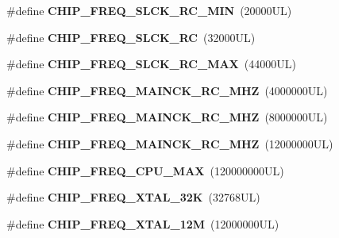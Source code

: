 \begin{DoxyCompactItemize}
\#define {\bfseries C\+H\+I\+P\+\_\+\+F\+R\+E\+Q\+\_\+\+S\+L\+C\+K\+\_\+\+R\+C\+\_\+\+M\+IN}~(20000\+U\+L)
\item 
\mbox{\label{group__SAMV71Q21__definitions_ga3de2f058a0254e9b117154f849ada7cc}} 
\#define {\bfseries C\+H\+I\+P\+\_\+\+F\+R\+E\+Q\+\_\+\+S\+L\+C\+K\+\_\+\+RC}~(32000\+U\+L)
\item 
\mbox{\label{group__SAMV71Q21__definitions_gaecd36c2831859a2de64e3dfcb753e8b2}} 
\#define {\bfseries C\+H\+I\+P\+\_\+\+F\+R\+E\+Q\+\_\+\+S\+L\+C\+K\+\_\+\+R\+C\+\_\+\+M\+AX}~(44000\+U\+L)
\item 
\mbox{\label{group__SAMV71Q21__definitions_gaa86cfccba0dc1e84357cc7613e25886f}} 
\#define {\bfseries C\+H\+I\+P\+\_\+\+F\+R\+E\+Q\+\_\+\+M\+A\+I\+N\+C\+K\+\_\+\+R\+C\+\_\+M\+HZ}~(4000000\+U\+L)
\item 
\mbox{\label{group__SAMV71Q21__definitions_gaa47e66cb0661306ff744015ae138967f}} 
\#define {\bfseries C\+H\+I\+P\+\_\+\+F\+R\+E\+Q\+\_\+\+M\+A\+I\+N\+C\+K\+\_\+\+R\+C\+\_\+M\+HZ}~(8000000\+U\+L)
\item 
\mbox{\label{group__SAMV71Q21__definitions_ga2395f8d0e2096afe77da9a88a86bba81}} 
\#define {\bfseries C\+H\+I\+P\+\_\+\+F\+R\+E\+Q\+\_\+\+M\+A\+I\+N\+C\+K\+\_\+\+R\+C\+\_\+M\+HZ}~(12000000\+U\+L)
\item 
\mbox{\label{group__SAMV71Q21__definitions_ga715bd749d7d9adf95f2248e77ea244ac}} 
\#define {\bfseries C\+H\+I\+P\+\_\+\+F\+R\+E\+Q\+\_\+\+C\+P\+U\+\_\+\+M\+AX}~(120000000\+U\+L)
\item 
\mbox{\label{group__SAMV71Q21__definitions_ga78ec308087884d119d47f4e419bc421c}} 
\#define {\bfseries C\+H\+I\+P\+\_\+\+F\+R\+E\+Q\+\_\+\+X\+T\+A\+L\+\_\+32K}~(32768\+U\+L)
\item 
\mbox{\label{group__SAMV71Q21__definitions_ga1760b80c5c7b36ef94de72a49f8f4c46}} 
\#define {\bfseries C\+H\+I\+P\+\_\+\+F\+R\+E\+Q\+\_\+\+X\+T\+A\+L\+\_\+12M}~(12000000\+U\+L)
\item 

\end{DoxyCompactItemize}
